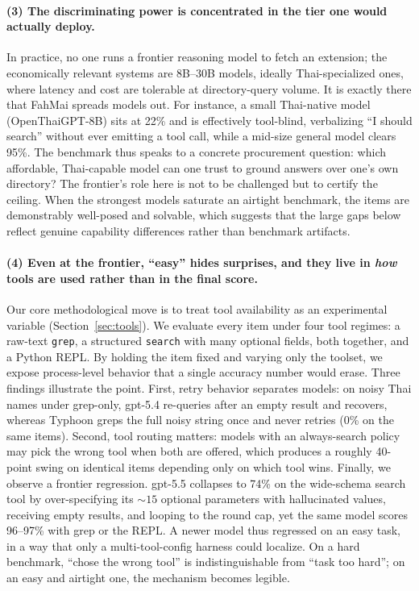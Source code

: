 \documentclass[11pt]{article}
\begin{document}
\paragraph{(3) The discriminating power is concentrated in the tier one would actually deploy.} In
practice, no one runs a frontier reasoning model to fetch an extension; the economically relevant
systems are 8B--30B models, ideally Thai-specialized ones, where latency and cost are tolerable at
directory-query volume. It is exactly there that FahMai spreads models out. For instance, a small
Thai-native model (OpenThaiGPT-8B) sits at 22\% and is effectively tool-blind, verbalizing ``I should
search'' without ever emitting a tool call, while a mid-size general model clears 95\%. The benchmark
thus speaks to a concrete procurement question: which affordable, Thai-capable model can one trust to
ground answers over one's own directory? The frontier's role here is not to be challenged but to
certify the ceiling. When the strongest models saturate an airtight benchmark, the items are
demonstrably well-posed and solvable, which suggests that the large gaps below reflect genuine
capability differences rather than benchmark artifacts.

\paragraph{(4) Even at the frontier, ``easy'' hides surprises, and they live in \emph{how} tools are
used rather than in the final score.} Our core methodological move is to treat tool availability as an
experimental variable (Section~\ref{sec:tools}). We evaluate every item under four tool regimes: a
raw-text \texttt{grep}, a structured \texttt{search} with many optional fields, both together, and a
Python REPL. By holding the item fixed and varying only the toolset, we expose process-level behavior
that a single accuracy number would erase. Three findings illustrate the point. First, retry behavior
separates models: on noisy Thai names under grep-only, gpt-5.4 re-queries after an empty result and
recovers, whereas Typhoon greps the full noisy string once and never retries (0\% on the same items).
Second, tool routing matters: models with an always-search policy may pick the wrong tool when both
are offered, which produces a roughly 40-point swing on identical items depending only on which tool
wins. Finally, we observe a frontier regression. gpt-5.5 collapses to 74\% on the wide-schema search
tool by over-specifying its ${\sim}15$ optional parameters with hallucinated values, receiving empty
results, and looping to the round cap, yet the same model scores 96--97\% with grep or the REPL. A
newer model thus regressed on an easy task, in a way that only a multi-tool-config harness could
localize. On a hard benchmark, ``chose the wrong tool'' is indistinguishable from ``task too hard'';
on an easy and airtight one, the mechanism becomes legible.
\end{document}
